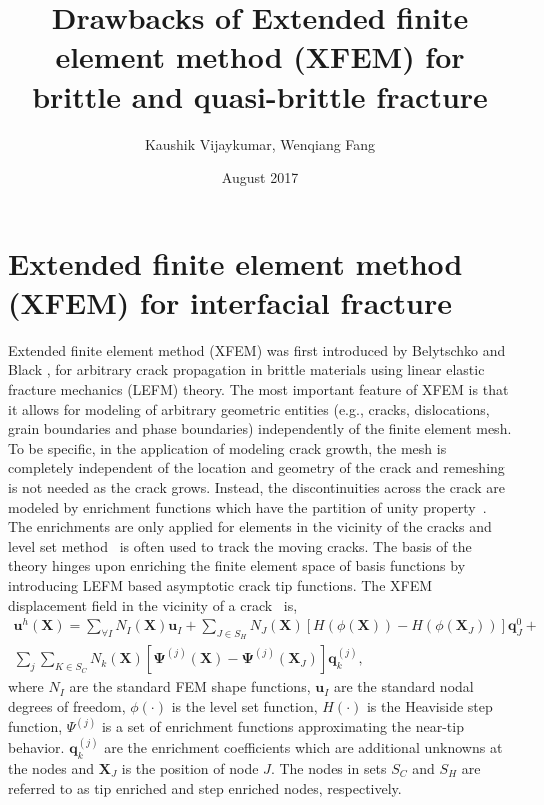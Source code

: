 \documentclass{article}
\title{Drawbacks of Extended finite element method (XFEM) for brittle and quasi-brittle fracture}
\author{Kaushik Vijaykumar, Wenqiang Fang}
\date{August 2017}
\begin{document}
\maketitle
\section{Extended finite element method (XFEM) for interfacial fracture}


Extended finite element method (XFEM) was first introduced by Belytschko and Black \cite{belytschko1999elastic}, for arbitrary crack propagation in brittle materials using linear elastic fracture mechanics (LEFM) theory. The most important feature of XFEM is that it allows for modeling of arbitrary geometric entities (e.g., cracks, dislocations, grain boundaries and phase boundaries) independently of the finite element mesh. To be specific, in the application of modeling crack growth, the mesh is completely independent of the location and geometry of the crack and remeshing is not needed as the crack grows. Instead, the discontinuities across the crack are modeled by enrichment functions which have the partition of unity property~\cite{melenk1996partition}. The enrichments are only applied for elements in the vicinity of the cracks and level set method~\cite{stolarska2001modelling} is often used to track the moving cracks. The basis of the theory hinges upon enriching the finite element space of basis functions by introducing LEFM based asymptotic crack tip functions. The XFEM displacement field in the vicinity of a crack~\cite{belytschko2013nonlinear} is,
\begin{multline}
	\bm{u}^h(\bm{X}) = \sum_{\forall I} N_I(\bm{X}) \bm{u}_I +  \sum_{J \in S_H} N_J(\bm{X}) [H(\phi(\bm{X})) - H(\phi(\bm{X}_J))] \bm{q}_J^0 + \\ 
	\sum_{j} \sum_{K \in S_C} N_k(\bm{X}) [\bm{\Psi}^{(j)}(\bm{X}) - \bm{\Psi}^{(j)}(\bm{X}_J)] \bm{q}_k^{(j)},
\end{multline}
where $N_I$ are the standard FEM shape functions, $\bm{u}_I $ are the standard nodal degrees of freedom, $\phi(\cdot)$ is the level set function, $H(\cdot)$ is the Heaviside step function, $\Psi^{(j)}$ is a set of enrichment functions approximating the near-tip behavior. $\bm{q}_k^{(j)}$ are the enrichment coefficients which are additional unknowns at the nodes and $\bm{X}_J$ is the position of node $J$. The nodes in sets $S_C$ and $S_H$ are referred to as tip enriched and step enriched nodes, respectively.
\end{document}
